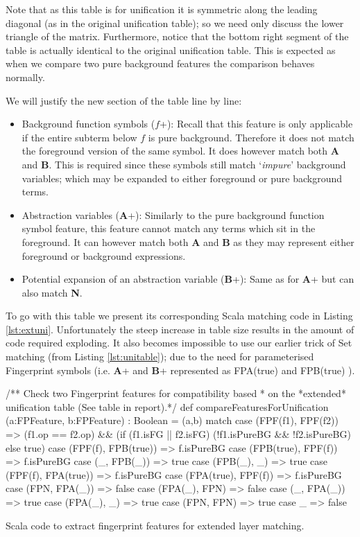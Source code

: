 Note that as this table is for unification it is symmetric along the leading diagonal (as in
the original unification table); so we need only discuss the lower triangle of the matrix.
Furthermore, notice that the bottom right segment of the table is actually identical to
the original unification table. This is expected as when we compare two
pure background features the comparison behaves normally.

We will justify the new section of the table line by line:
\begin{itemize}
\item Background function symbols ($f$+): Recall that this feature is only applicable
if the entire subterm below $f$ is pure background. Therefore it does not
match the foreground version of the same symbol. It does however match both
\textbf{A} and \textbf{B}. This is required since these symbols still match `\emph{impure}' background variables;
which may be expanded to either foreground or pure background terms.
\item Abstraction variables (\textbf{A}+): Similarly to the pure background function symbol
feature, this feature cannot match any terms which sit in the foreground. It can however
match both \textbf{A} and \textbf{B} as they may represent either foreground or background
expressions.
\item Potential expansion of an abstraction variable (\textbf{B}+): Same as for \textbf{A}+
but can also match \textbf{N}.
\end{itemize}

To go with this table we present its corresponding Scala matching code in Listing \ref{lst:extuni}.
Unfortunately the steep increase in table size results in the amount of code required exploding.
It also becomes impossible to use our earlier trick of Set matching (from Listing \ref{lst:unitable}); due to the need for parameterised
Fingerprint symbols (i.e. \textbf{A}+ and \textbf{B}+ represented as FPA(true) and FPB(true) ).
\begin{listing}[H]
\begin{scalacode}
 /** Check two Fingerprint features for compatibility based
   * on the *extended* unification table (See table in report).*/
  def compareFeaturesForUnification
      (a:FPFeature, b:FPFeature) : Boolean = 
  (a,b) match {
    case (FPF(f1), FPF(f2))    => (f1.op == f2.op) && 
                                  (if (f1.isFG || f2.isFG) 
                                      (!f1.isPureBG && !f2.isPureBG)
                                   else true)
    case (FPF(f), FPB(true)) => f.isPureBG
    case (FPB(true), FPF(f)) => f.isPureBG
    case (_, FPB(_))         => true
    case (FPB(_), _)         => true
    case (FPF(f), FPA(true)) => f.isPureBG
    case (FPA(true), FPF(f)) => f.isPureBG
    case (FPN, FPA(_))       => false
    case (FPA(_), FPN)       => false
    case (_, FPA(_))         => true
    case (FPA(_), _)         => true
    case (FPN, FPN)          => true
    case _                   => false
  }
\end{scalacode}
\caption{Scala code to extract fingerprint features for extended layer matching.}
\label{lst:extuni}
\end{listing}

